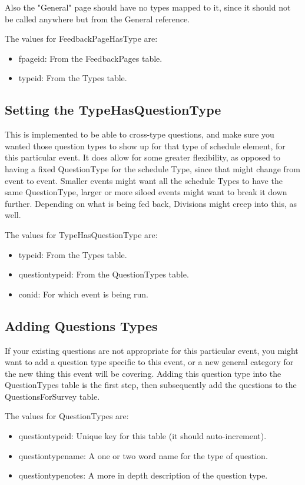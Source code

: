 \documentclass[captions=tablesignature]{scrartcl}
\begin{document}
Also the "General" page should have no types mapped to it, since it
should not be called anywhere but from the General reference.

The values for FeedbackPageHasType are:
\begin{itemize}
\item fpageid: From the FeedbackPages table.
\item typeid: From the Types table.
\end{itemize}

\subsection{Setting the TypeHasQuestionType}
\label{sec-15-3}

This is implemented to be able to cross-type questions, and make
sure you wanted those question types to show up for that type of
schedule element, for this particular event.  It does allow for
some greater flexibility, as opposed to having a fixed QuestionType
for the schedule Type, since that might change from event to event.
Smaller events might want all the schedule Types to have the same
QuestionType, larger or more siloed events might want to break it
down further.  Depending on what is being fed back, Divisions might
creep into this, as well.

The values for TypeHasQuestionType are:
\begin{itemize}
\item typeid: From the Types table.
\item questiontypeid: From the QuestionTypes table.
\item conid: For which event is being run.
\end{itemize}

\subsection{Adding Questions Types}
\label{sec-15-4}

If your existing questions are not appropriate for this particular
event, you might want to add a question type specific to this
event, or a new general category for the new thing this event will
be covering.  Adding this question type into the QuestionTypes
table is the first step, then subsequently add the questions to the
QuestionsForSurvey table.

The values for QuestionTypes are:
\begin{itemize}
\item questiontypeid: Unique key for this table (it should auto-increment).
\item questiontypename: A one or two word name for the type of question.
\item questiontypenotes: A more in depth description of the question type.
\end{itemize}
\end{document}
